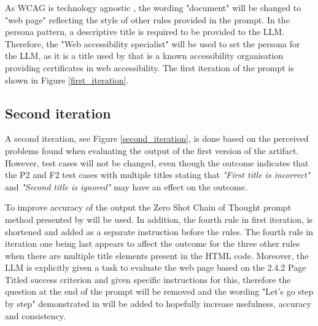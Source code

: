 As WCAG is technology agnostic \citep{wcag22}, the wording "document" will be changed to "web page" reflecting the style of other rules provided in the prompt. In the persona pattern, a descriptive title is required to be provided to the LLM. Therefore, the "Web accessibility specialist" will be used to set the persona for the LLM, as it is a title used by \textcite{web_accessibility_specialist} that is a known accessibility organisation providing certificates in web accessibility. The first iteration of the prompt is shown in Figure \ref{first_iteration}.


\subsection{Second iteration}

A second iteration, see Figure \ref{second_iteration}, is done based on the perceived problems found when evaluating the output of the first version of the artifact. However, test cases will not be changed, even though the outcome indicates that the P2 and F2 test cases with multiple titles stating that \textit{"First title is incorrect"} and \textit{"Second title is ignored"} may have an effect on the outcome.

To improve accuracy of the output the Zero Shot Chain of Thought prompt method presented by \textcite{kojima2023large} will be used. In addition, the fourth rule in first iteration, is shortened and added as a separate instruction before the rules. The fourth rule in iteration one being last appears to affect the outcome for the three other rules when there are multiple title elements present in the HTML code. Moreover, the LLM is explicitly given a task to evaluate the web page based on the 2.4.2 Page Titled success criterion and given specific instructions for this, therefore the question at the end of the prompt will be removed and the wording "Let's go step by step" demonstrated in \textcite{kojima2023large} will be added to hopefully increase usefulness, accuracy and consistency.

